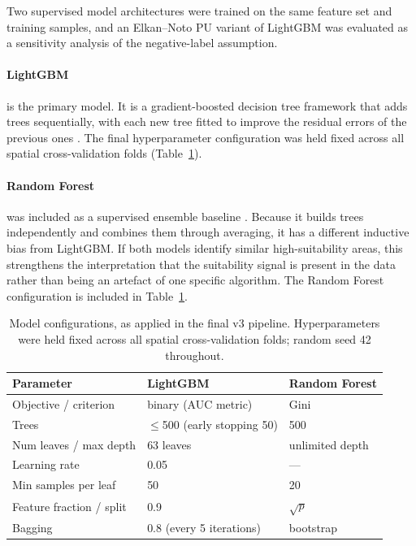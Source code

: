 \documentclass[land,article,submit,moreauthors]{Definitions/mdpi}
\begin{document}
Two supervised model architectures were trained on the same feature set and training samples, and an Elkan--Noto PU variant of LightGBM was evaluated as a sensitivity analysis of the negative-label assumption.

\paragraph{LightGBM} is the primary model. It is a gradient-boosted decision tree framework that adds trees sequentially, with each new tree fitted to improve the residual errors of the previous ones \citep{ke2017lightgbm}. The final hyperparameter configuration was held fixed across all spatial cross-validation folds (Table~\ref{tab:model-config}).

\paragraph{Random Forest} was included as a supervised ensemble baseline \citep{breiman2001}. Because it builds trees independently and combines them through averaging, it has a different inductive bias from LightGBM. If both models identify similar high-suitability areas, this strengthens the interpretation that the suitability signal is present in the data rather than being an artefact of one specific algorithm. The Random Forest configuration is included in Table~\ref{tab:model-config}.

\begin{table}[H]
\centering
\caption{Model configurations, as applied in the final v3 pipeline. Hyperparameters were held fixed across all spatial cross-validation folds; random seed 42 throughout.}
\label{tab:model-config}
\footnotesize
\begin{tabular}{@{} l l l @{}}
\toprule
\textbf{Parameter} & \textbf{LightGBM} & \textbf{Random Forest} \\
\midrule
Objective / criterion   & binary (AUC metric) & Gini \\
Trees                   & $\leq$500 (early stopping 50) & 500 \\
Num leaves / max depth  & 63 leaves & unlimited depth \\
Learning rate           & 0.05 & --- \\
Min samples per leaf    & 50 & 20 \\
Feature fraction / split & 0.9 & $\sqrt{p}$ \\
Bagging                 & 0.8 (every 5 iterations) & bootstrap \\
\bottomrule
\end{tabular}
\end{table}
\end{document}
